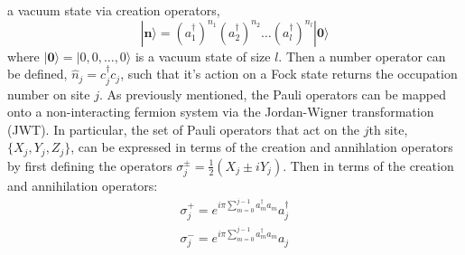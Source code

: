a vacuum state via creation operators,
\begin{equation}
    |{\mathbf n}\rangle = (a_1^{\dagger})^{n_1} (a_2^{\dagger})^{n_2} \dots (a_{l}^{\dagger})^{n_l}|{\mathbf 0}\rangle
\end{equation}
where $|{\mathbf 0}\rangle = |0,0,\dots,0\rangle$ is a vacuum state of size $l$. Then a number operator can be defined,
$\hat{n}_j = c^{\dagger}_j c_j$, such that it's action on a Fock state returns the occupation number on site $j$.
As previously mentioned, the Pauli operators can be mapped onto a non-interacting fermion system via
the Jordan-Wigner transformation (JWT). In particular, the set of Pauli operators that act on the $j$th site,
$\{X_j, Y_j, Z_j\}$, can be expressed in terms of the creation and annihlation operators by first defining
the operators $\sigma^{\pm}_j = \frac{1}{2}(X_j \pm iY_j)$. Then in terms of the creation and annihilation
operators:
\begin{align}
    \sigma^{+}_j = e^{i\pi\sum^{j-1}_{m = 0} a^{\dagger}_m a_m} a_j^{\dagger} \\
    \sigma^{-}_j = e^{i\pi\sum^{j-1}_{m = 0} a^{\dagger}_m a_m} a_j
\end{align}















